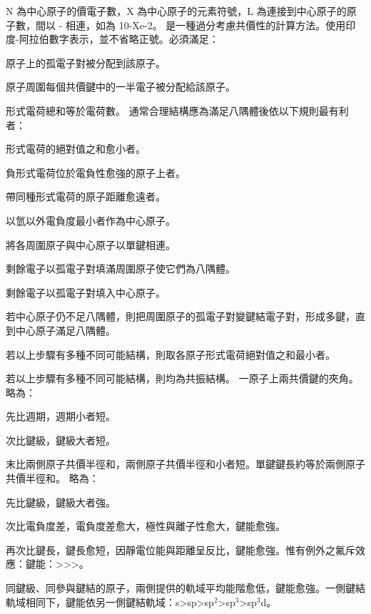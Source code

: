 \documentclass[a4paper,12pt]{report}
\begin{document}
N 為中心原子的價電子數，X 為中心原子的元素符號，L 為連接到中心原子的原子數，間以 - 相連，如為 10-Xe-2。
是一種過分考慮共價性的計算方法。使用印度-阿拉伯數字表示，並不省略正號。必須滿足：
\bit
\item 原子上的孤電子對被分配到該原子。
\item 原子周圍每個共價鍵中的一半電子被分配給該原子。
\item 形式電荷總和等於電荷數。
\eit
通常合理結構應為滿足八隅體後依以下規則最有利者：
\ben
\item 形式電荷的絕對值之和愈小者。
\item 負形式電荷位於電負性愈強的原子上者。
\item 帶同種形式電荷的原子距離愈遠者。
\een
{}
\ben
\item 以氫以外電負度最小者作為中心原子。
\item 將各周圍原子與中心原子以單鍵相連。
\item 剩餘電子以孤電子對填滿周圍原子使它們為八隅體。
\item 剩餘電子以孤電子對填入中心原子。
\item 若中心原子仍不足八隅體，則把周圍原子的孤電子對變鍵結電子對，形成多鍵，直到中心原子滿足八隅體。
\item 若以上步驟有多種不同可能結構，則取各原子形式電荷絕對值之和最小者。
\item 若以上步驟有多種不同可能結構，則均為共振結構。
\een
{}
一原子上兩共價鍵的夾角。
略為：
\ben
\item 先比週期，週期小者短。
\item 次比鍵級，鍵級大者短。
\item 末比兩側原子共價半徑和，兩側原子共價半徑和小者短。單鍵鍵長約等於兩側原子共價半徑和。
\een
{}
略為：
\ben
\item 先比鍵級，鍵級大者強。
\item 次比電負度差，電負度差愈大，極性與離子性愈大，鍵能愈強。
\item 再次比鍵長，鍵長愈短，因靜電位能與距離呈反比，鍵能愈強。惟有例外之氟斥效應：鍵能：>>>。
\item 同鍵級、同參與鍵結的原子，兩側提供的軌域平均能階愈低，鍵能愈強。一側鍵結軌域相同下，鍵能依另一側鍵結軌域：s>sp>sp$^2$>sp$^3$>sp$^3$d。
\een
\end{document}
